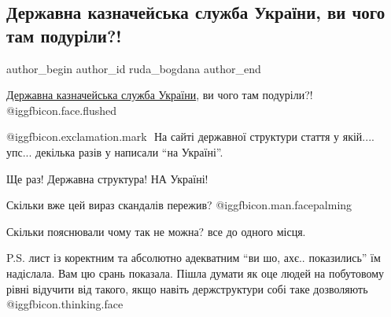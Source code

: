  
 
 
 
 
 
\subsection{Державна казначейська служба України, ви чого там подуріли?!}
\label{sec:09_12_2021.fb.ruda_bogdana.1.derzh_kaznachejska_sluzhba_mova}
 
\ifcmt
 author_begin
   author_id ruda_bogdana
 author_end
\fi

\href{https://www.facebook.com/StateTreasuryUA}{Державна казначейська служба України}, ви чого там подуріли?!
@igg{fbicon.face.flushed} 

@igg{fbicon.exclamation.mark} ️ На сайті державної структури стаття у якій....
упс... декілька разів у написали \enquote{на Україні}.


Ще раз! Державна структура! НА Україні!

Скільки вже цей вираз скандалів пережив? @igg{fbicon.man.facepalming} 

Скільки пояснювали чому так не можна? все до одного місця.

P.S. лист із коректним та абсолютно адекватним \enquote{ви шо, ахє..
показились} їм надіслала. Вам цю срань показала. Пішла думати як оце людей на
побутовому рівні відучити від такого, якщо навіть держструктури собі таке
дозволяють @igg{fbicon.thinking.face} 

